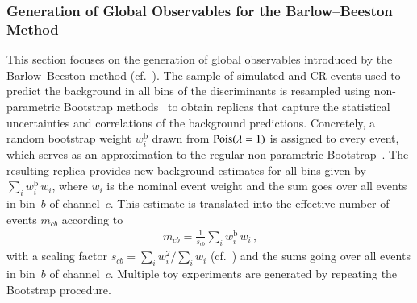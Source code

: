 \subsubsection{Generation of Global Observables for the Barlow--Beeston Method}

This section focuses on the generation of global observables introduced by the
Barlow--Beeston method (cf.~).
%
%
%
The sample of simulated and CR events used to predict the background in all bins
of the discriminants is resampled using non-parametric Bootstrap
methods~\cite{10.1214/aos/1176344552,efron1994introduction} to obtain replicas
that capture the statistical uncertainties and correlations of the background
predictions. Concretely, a random bootstrap weight $w_i^{\text{b}}$ drawn from
$\operatorname{Pois}(\lambda = 1)$ is assigned to every event, which serves as an
approximation to the regular non-parametric
Bootstrap~\cite{google:poisson,ATL-PHYS-PUB-2021-011}. The resulting replica
provides new background estimates for all bins given
by~$\sum_{i} w_{i}^{\text{b}} \, w_i$, where $w_i$ is the nominal event weight
and the sum goes over all events in bin~$b$ of channel~$c$. This estimate is
translated into the effective number of events $m_{cb}$ according to
\begin{align*}
  m_{cb} = \frac{1}{s_{cb}} \sum_{i} w_{i}^{\text{b}} \, w_i \,\text{,}
\end{align*}
with a scaling factor $s_{cb} = \sum_i w_i^2 / \sum_i w_i$
(cf.~) and the sums going over all events in bin~$b$ of
channel~$c$. Multiple toy experiments are generated by repeating the Bootstrap
procedure.

